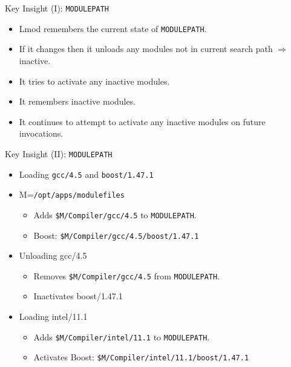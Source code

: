 \documentclass{beamer}
\begin{document}
\begin{frame}{Key Insight (I): \texttt{MODULEPATH}}
  \begin{itemize}
    \item Lmod remembers the current state of \texttt{MODULEPATH}.
    \item If it changes then it unloads any modules not in current
      search path $\Rightarrow$ inactive.
    \item It tries to activate any inactive modules.
    \item It remembers inactive modules.
    \item It continues to attempt to activate any inactive modules on
      future invocations.
  \end{itemize}
\end{frame}

\begin{frame}{Key Insight (II): \texttt{MODULEPATH}}
  \begin{itemize}
    \item Loading \texttt{gcc/4.5} and \texttt{boost/1.47.1}
    \item M=\texttt{{\color{blue}/opt/apps/modulefiles}}
      \begin{itemize}
        \item Adds \texttt{{\color{blue}\$M}/Compiler/gcc/4.5} to
          \texttt{MODULEPATH}.
        \item Boost: \texttt{{\color{blue}\$M}/Compiler/gcc/4.5/boost/1.47.1}
      \end{itemize}
    \item Unloading gcc/4.5
      \begin{itemize}
        \item Removes \texttt{{\color{blue}\$M}/Compiler/gcc/4.5}
          from \texttt{MODULEPATH}.
        \item Inactivates boost/1.47.1
      \end{itemize}
    \item Loading intel/11.1
      \begin{itemize}
        \item Adds \texttt{{\color{blue}\$M}/Compiler/intel/11.1} to
          \texttt{MODULEPATH}.
        \item Activates Boost: \texttt{{\color{blue}\$M}/Compiler/intel/11.1/boost/1.47.1}
      \end{itemize}
  \end{itemize}
\end{frame}
\end{document}
